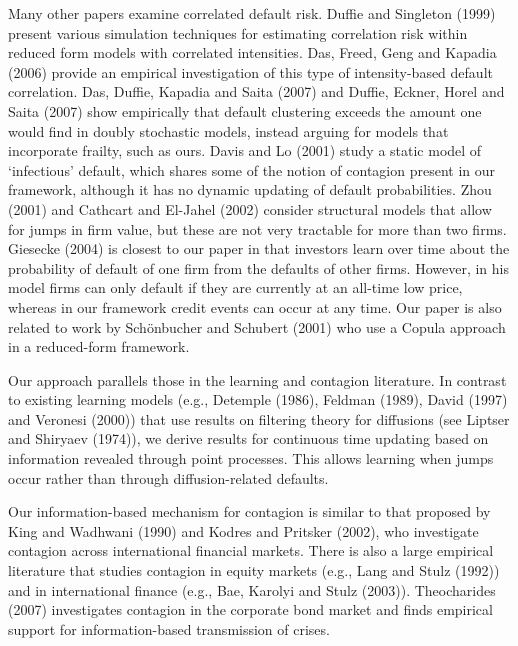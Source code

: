 \documentclass[titlepage,11pt]{article}
\begin{document}
Many other papers examine correlated default risk.  Duffie and
Singleton (1999) present various simulation techniques for
estimating correlation risk within reduced form models with
correlated intensities. Das, Freed, Geng and Kapadia (2006) provide
an empirical investigation of this type of intensity-based default
correlation.  Das, Duffie, Kapadia and Saita (2007) and
Duffie, Eckner, Horel and Saita (2007) show empirically that default
clustering exceeds the amount one would find in doubly stochastic models, instead arguing
for models that incorporate frailty, such as ours.\nocite {DDas, DEHS07}
Davis and Lo (2001) study a static model of
`infectious' default, which shares some of the notion of contagion
present in our framework, although it has no dynamic
updating of default probabilities. Zhou (2001)\nocite{zho01} and
Cathcart and El-Jahel (2002) consider structural models that allow
for jumps in firm value, but these are not very tractable for more
than two firms. Giesecke (2004) is closest to our paper in that
investors learn over time about the probability of default of one
firm from the defaults of other firms. However, in his model firms
can only default if they are currently at an all-time low price,
whereas in our framework credit events can occur at any time.
Our paper is also related to
work by Sch\"onbucher and Schubert (2001) who use a Copula
approach in a reduced-form framework.

Our approach parallels those in the learning and contagion
literature. In contrast to existing learning models (e.g., Detemple
(1986), Feldman (1989), David (1997) and Veronesi
(2000))\nocite{det86,fel89,ver00,dav97} that use results on
filtering theory for diffusions (see Liptser and Shiryaev
(1974)),\nocite{lipshi74bo} we derive results for continuous time
updating based on information revealed through point processes. This
allows learning when jumps occur rather than through diffusion-related defaults.

Our information-based mechanism for contagion is similar to that
proposed by King and Wadhwani (1990) and Kodres
and Pritsker (2002),\nocite{kodpri02} who investigate contagion
across international financial markets. There is also a large
empirical literature that studies contagion in equity markets (e.g.,
Lang and Stulz (1992)\nocite{lanstu92}) and in international finance
(e.g., Bae, Karolyi and Stulz (2003)).\nocite{baekar03} Theocharides (2007)\nocite{theo07}
investigates contagion in the corporate bond market and finds
empirical support for information-based transmission of crises.
\end{document}
